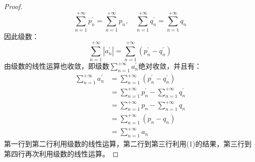 \begin{proof}
	\begin{equation*}
		\sum_{n=1}^{+\infty}p^{'}_n=\sum_{n=1}^{+\infty}p_n,\quad
		\sum_{n=1}^{+\infty}q^{'}_n=\sum_{n=1}^{+\infty}q_n
	\end{equation*}
	因此级数：
	\begin{equation*}
		\sum_{n=1}^{+\infty}|a^{'}_n|=\sum_{n=1}^{+\infty}(p^{'}_n-q^{'}_n)
	\end{equation*}
	由级数的线性运算也收敛，即级数$\sum\limits_{n=1}^{+\infty}a^{'}_n$绝对收敛，并且有：
	\begin{align*}
		\sum_{n=1}^{+\infty}a^{'}_n
		&=\sum_{n=1}^{+\infty}(p^{'}_n-q^{'}_n) \\
		&=\sum_{n=1}^{+\infty}p^{'}_n-\sum_{n=1}^{+\infty}q^{'}_n \\
		&=\sum_{n=1}^{+\infty}p_n-\sum_{n=1}^{+\infty}q_n \\
		&=\sum_{n=1}^{+\infty}(p_n-q_n) \\
		&=\sum_{n=1}^{+\infty}a_n
	\end{align*}
	第一行到第二行利用级数的线性运算，第二行到第三行利用(1)的结果，第三行到第四行再次利用级数的线性运算。
\end{proof}


